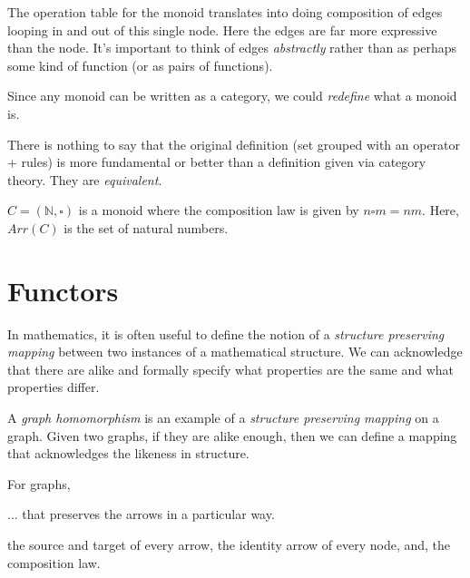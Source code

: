\frmrule

The operation table for the monoid translates into 
doing composition of edges looping in and out of this single node. 
Here the edges are far more expressive than the node. 
It's important to think of edges \textit{abstractly} rather than 
as perhaps some kind of function (or as pairs of functions). 

Since any monoid can be written as a category, 
we could \textit{redefine} what a monoid is. 


There is nothing to say that the original definition 
(set grouped with an operator + rules) is more 
fundamental or better than a definition given via category theory. 
They are \textit{equivalent}. 

\frmrule


\begin{example}
$C = (\mathbb{N}, \square)$ is a monoid where the composition law is given by $n \square m = nm$.
Here, $Arr(C)$ is the set of natural numbers. 
\end{example}

\frmrule


\section{Functors}

In mathematics, it is often useful to define the notion of 
a \textit{structure preserving mapping} 
between two instances of a mathematical structure. 
We can acknowledge that there are alike and formally specify 
what properties are the same and what properties differ. 

A \textit{graph homomorphism} is an example 
of a \textit{structure preserving mapping} on a graph. 
Given two graphs, if they are alike enough, 
then we can define a mapping that acknowledges the likeness
in structure.

For graphs,  




... that preserves the arrows in a particular way. 

the source and target of every arrow, the identity arrow of every node, 
and, the composition law.

